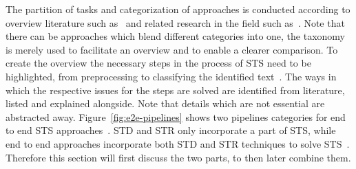 The partition of tasks and categorization of approaches is conducted according to overview literature
such as~\cite{long_scene_2021,chen_text_2021,cong_comparative_2019} and related research in the
field such as~\cite{qiao_text_2021,sheng_centripetaltext_2021,liu_accurate_2020,deng_pixellink_2018}.
Note that there can be approaches which blend different categories into one, the taxonomy
is merely used to facilitate an overview and to enable a clearer comparison.
To create the overview the necessary steps in the process of \ac{STS} need to be highlighted,
from preprocessing to classifying the identified
text~\citep{long_scene_2021, sourvanos_challenges_2018}.
The ways in which the respective issues for the steps are solved are identified from literature,
listed and explained alongside.
Note that details which are not essential are abstracted away.
Figure~\ref{fig:e2e-pipelines} shows two pipelines categories for end to end \ac{STS}
approaches~\citep{long_scene_2021}.
\ac{STD} and \ac{STR} only incorporate a part of \ac{STS}, while end to end approaches
incorporate both \ac{STD} and \ac{STR} techniques to solve
\ac{STS}~\citep{long_scene_2021,ghosh_visual_2017,chen_text_2021}.
Therefore this section will first discuss the two parts, to then later combine them.


